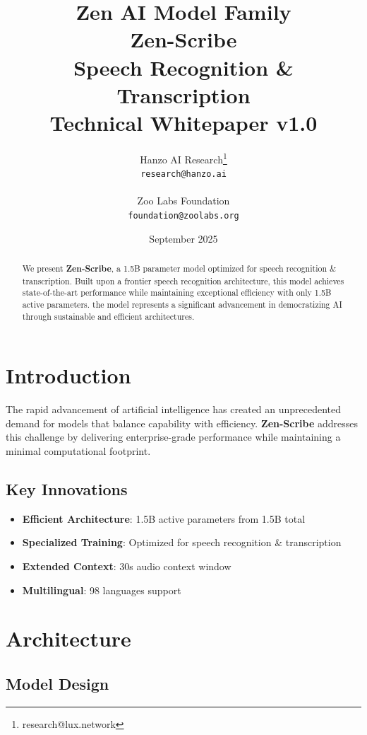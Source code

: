 \documentclass[11pt,a4paper]{article}
\title{
    \vspace{-2cm}
    \Large \textbf{Zen AI Model Family} \\
    \vspace{0.5cm}
    \Huge \textbf{Zen-Scribe} \\
    \vspace{0.3cm}
    \large Speech Recognition \&   Transcription \\
    \vspace{0.5cm}
    \normalsize Technical Whitepaper v1.0
}
\author{
    Hanzo AI Research\thanks{research@lux.network} \\
    \texttt{research@hanzo.ai} \\
    \\
    Zoo Labs Foundation \\
    \texttt{foundation@zoolabs.org}
}
\date{September 2025}
\begin{document}
\maketitle

\begin{abstract}
We present \textbf{Zen-Scribe}, a 1.5B parameter model optimized for speech recognition \&   transcription. 
Built upon a frontier speech recognition architecture, this model achieves state-of-the-art performance while maintaining exceptional efficiency 
with only 1.5B active parameters. the model represents a significant advancement in democratizing AI through sustainable and efficient architectures.
\end{abstract}

\tableofcontents
\newpage

\section{Introduction}

The rapid advancement of artificial intelligence has created an unprecedented demand for models that balance capability with efficiency. 
\textbf{Zen-Scribe} addresses this challenge by delivering enterprise-grade performance while maintaining a minimal computational footprint.

\subsection{Key Innovations}
\begin{itemize}
    \item \textbf{Efficient Architecture}: 1.5B active parameters from 1.5B total
    \item \textbf{Specialized Training}: Optimized for speech recognition \& transcription
    \item \textbf{Extended Context}: 30s audio context window
    
    
    \item \textbf{Multilingual}: 98 languages support
\end{itemize}

\section{Architecture}

\subsection{Model Design}
\end{document}
